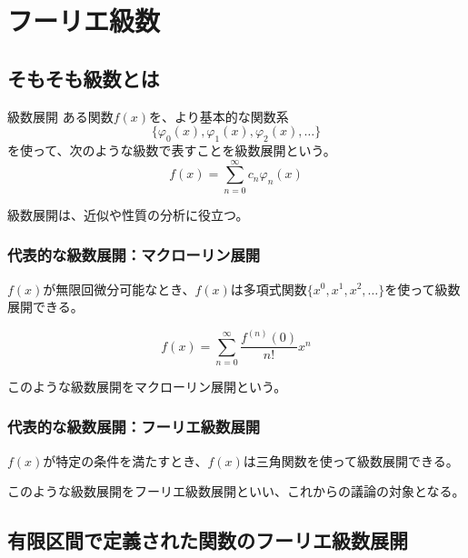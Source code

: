 \documentclass[16pt,b5paper]{book}
\begin{document}
\section{フーリエ級数}

\subsection{そもそも級数とは}

\begin{definition}{級数展開}
  \newline
  ある関数$f(x)$を、より基本的な関数系
  \Large
  \begin{equation}
    \{\varphi_0(x), \varphi_1(x), \varphi_2(x), \dots\}
  \end{equation}
  \normalsize
  を使って、次のような級数で表すことを級数展開という。
  \LARGE
  \begin{equation}
    f(x) = \sum_{n=0}^{\infty} c_n \varphi_n(x)
  \end{equation}
\end{definition}

級数展開は、近似や性質の分析に役立つ。

\subsubsection{代表的な級数展開：マクローリン展開}

$f(x)$が無限回微分可能なとき、$f(x)$は多項式関数$\{x^0, x^1, x^2, \dots\}$を使って級数展開できる。

\begin{equation}
  f(x) = \sum_{n=0}^{\infty} \dfrac{f^{(n)}(0)}{n!}x^n
\end{equation}

このような級数展開をマクローリン展開という。

\subsubsection{代表的な級数展開：フーリエ級数展開}

$f(x)$が特定の条件を満たすとき、$f(x)$は三角関数を使って級数展開できる。

このような級数展開をフーリエ級数展開といい、これからの議論の対象となる。

\subsection{有限区間で定義された関数のフーリエ級数展開}
\end{document}
